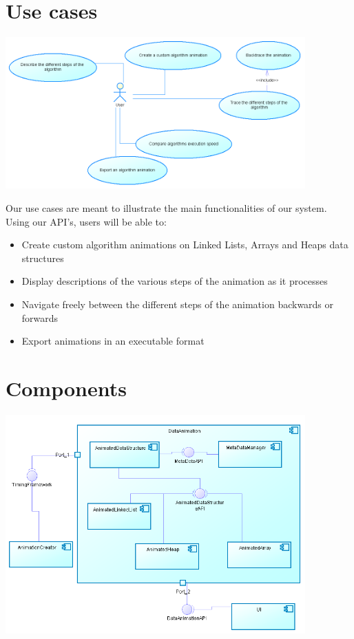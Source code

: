 \documentclass{l3proj}
\begin{document}
\section{Use cases}
\includegraphics[width=115mm]{images/useCases.png}

Our use cases are meant to illustrate the main functionalities of our system. Using our API's, users will
be able to:
\begin{itemize}
\item Create custom algorithm animations on Linked Lists, Arrays and Heaps data structures
\item Display descriptions of the various steps of the animation as it processes
\item Navigate freely between the different steps of the animation backwards or forwards
\item Export animations in an executable format
\end{itemize}
\section{Components}
\includegraphics[width=115mm]{images/componentDiagram.png}
\end{document}
